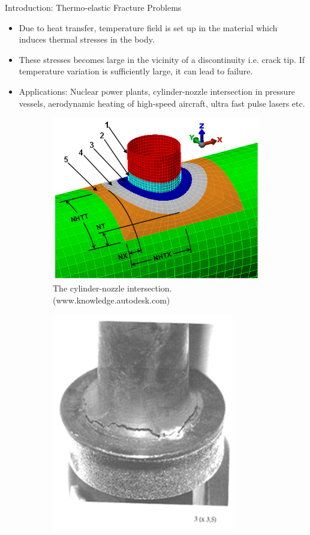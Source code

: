 \documentclass{beamer}
\begin{document}
\begin{frame}[t,fragile]{Introduction: Thermo-elastic Fracture Problems}
    \vspace{-.3cm}
    \begin{itemize}
        \item Due to heat transfer, temperature field is set up in the material which induces thermal stresses in the body.
\item These stresses becomes large in the vicinity of a discontinuity i.e. crack tip. If temperature variation is sufficiently large, it can lead to failure.
        \item Applications: Nuclear power plants, cylinder-nozzle
 intersection in pressure vessels, aerodynamic heating of high-speed aircraft, ultra fast pulse lasers etc.
   \end{itemize}
   \vspace{-.5cm}
\begin{figure}[H]
    \hspace{.7cm}
      \begin{subfigure}{0.45\textwidth}
    \centering
 \includegraphics[scale=.1]{cyl.png}
 \caption{\tiny{The cylinder-nozzle intersection. (www.knowledge.autodesk.com)}}
 \label{cyl}
 \end{subfigure}
\begin{subfigure}{0.45\textwidth}
    \centering
 \includegraphics[scale=.1]{fail.jpg}

\end{subfigure}
\end{figure}
\end{frame}
\end{document}
